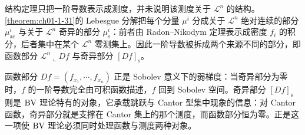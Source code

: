 \documentclass[../../main.tex]{subfiles}%
\begin{document}
\begin{remark}\label{remark:ch05-def-5-1-测度分解-动机}
结构定理只把一阶导数表示成测度，并未说明该测度关于 $\mathcal{L}^n$ 的结构。\cref{theorem:ch01-1-31}的 Lebesgue 分解把每个分量 $\mu^i$ 分成关于 $\mathcal{L}^n$ 绝对连续的部分 $\mu^i_{\mathrm{ac}}$ 与关于 $\mathcal{L}^n$ 奇异的部分 $\mu^i_{\mathrm{s}}$：前者由 Radon--Nikodym 定理表示成密度 $f_i$ 的积分，后者集中在某个 $\mathcal{L}^n$ 零测集上。因此一阶导数被拆成两个来源不同的部分，即函数部分 $\mathcal{L}^n\llcorner Df$ 与奇异部分 $[Df]_{\mathrm{s}}$。%

函数部分 $Df=(f_{x_1},\cdots,f_{x_n})$ 正是 Sobolev 意义下的弱梯度：当奇异部分为零时，$f$ 的一阶导数完全由可积函数描述，$f$ 回到 Sobolev 空间。奇异部分 $[Df]_{\mathrm{s}}$ 则是 $\mathrm{BV}$ 理论特有的对象，它承载跳跃与 Cantor 型集中现象的信息：对 Cantor 函数，奇异部分就是支撑在 Cantor 集上的那个测度，而函数部分恒为零。正是这一项使 $\mathrm{BV}$ 理论必须同时处理函数与测度两种对象。%
\end{remark}
\end{document}
